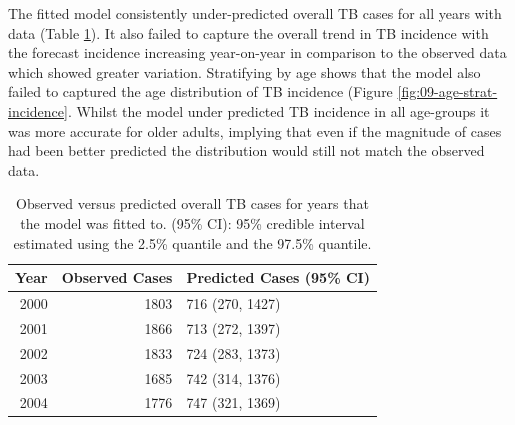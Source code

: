 \documentclass[11pt,twoside]{bristolthesis}
\begin{document}
  The fitted model consistently under-predicted overall TB cases for all years with data (Table \ref{tab:09-table-incidence-preds}). It also failed to capture the overall trend in TB incidence with the forecast incidence increasing year-on-year in comparison to the observed data which showed greater variation. Stratifying by age shows that the model also failed to captured the age distribution of TB incidence (Figure \ref{fig:09-age-strat-incidence}. Whilst the model under predicted TB incidence in all age-groups it was more accurate for older adults, implying that even if the magnitude of cases had been better predicted the distribution would still not match the observed data.
  \begin{longtable}{rrl}
  \caption[Observed versus predicted overall TB cases for years that the model was fitted to.]{\label{tab:09-table-incidence-preds}Observed versus predicted overall TB cases for years that the model was fitted to. (95\% CI): 95\% credible interval estimated using the 2.5\% quantile and the 97.5\% quantile.}\\
  \toprule
  Year & Observed Cases & Predicted Cases (95\% CI)\\
  \midrule
  2000 & 1803 & 716 (270, 1427)\\
  2001 & 1866 & 713 (272, 1397)\\
  2002 & 1833 & 724 (283, 1373)\\
  2003 & 1685 & 742 (314, 1376)\\
  2004 & 1776 & 747 (321, 1369)\\
  \bottomrule
  \end{longtable}
\end{document}
